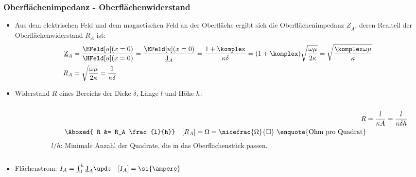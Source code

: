 \begin{frame}
   \frametitle{Oberflächenimpedanz - Oberflächenwiderstand}
\begin{itemize}[<+->]
    \item Aus dem elektrischen Feld und dem magnetischen Feld an der Oberfläche ergibt sich die \alert{Oberflächenimpedanz} $\underbar{Z}_A$, deren Realteil der \alert{Oberflächenwiderstand} $R_A$ ist:
\begin{align*}
        \underbar{Z}_A &= \frac{ \EFeld[u](x=0)}{\HFeld[u](x=0)} = \frac{ \EFeld[u](x=0)}{ \underbar{J}_A } = \frac{1+\komplex}{\kappa\delta} = (1+\komplex) \sqrt{\frac{\omega\mu}{2\kappa}} = \sqrt{\frac{\komplex \omega \mu}{\kappa}}\\
        R_A &= \sqrt{\frac{\omega\mu}{2\kappa}} = \frac{1}{\kappa\delta}
     \end{align*}
     \item \alert{Widerstand} $R$ eines Bereichs der Dicke $\delta$, Länge $l$ und Höhe $h$:
\begin{columns}
    \begin{column}{.3\linewidth}
    \end{column}
    \begin{column}{.7\linewidth}
       \begin{align*}
         R &= \frac{l}{\kappa A} = \frac{l}{\kappa \delta h}\\
        \Aboxed{ R &= R_A \frac{l}{h}} \quad [R_A] = \Omega = \nicefrac{\Omega}{\Box} \text{ \enquote{Ohm pro Quadrat}}
       \end{align*}
      $l/h$: Minimale Anzahl der Quadrate, die in das Oberflächenstück passen.
     \end{column}
 \end{columns}  
     \item \alert{Flächenstrom}: $I_A=\int_0^h \underbar{J}_A  \upd z \quad [I_A] = \si{\ampere}$
 \end{itemize}
\end{frame}

